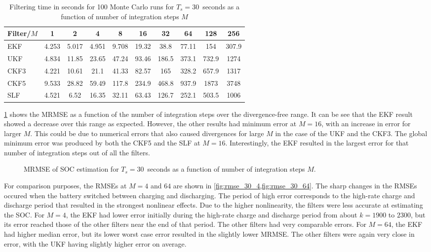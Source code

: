 \documentclass[../zhang_thesis.tex]{subfiles}
\begin{document}
\begin{table}[h]
\centering
\caption{Filtering time in seconds for 100 Monte Carlo runs for $T_s=30$~seconds as a function of number of integration steps $M$}
\begin{tabular}{@{}lccccccccc@{}}
\toprule
Filter/$M$ & 1     & 2     & 4     & 8     & 16    & 32    & 64    & 128   & 256   \\ \midrule
EKF        & 4.253 & 5.017 & 4.951 & 9.708 & 19.32 & 38.8  & 77.11 & 154   & 307.9 \\
UKF        & 4.834 & 11.85 & 23.65 & 47.24 & 93.46 & 186.5 & 373.1 & 732.9 & 1274  \\
CKF3       & 4.221 & 10.61 & 21.1  & 41.33 & 82.57 & 165   & 328.2 & 657.9 & 1317  \\
CKF5       & 9.533 & 28.82 & 59.49 & 117.8 & 234.9 & 468.8 & 937.9 & 1873  & 3748  \\
SLF        & 4.521 & 6.52  & 16.35 & 32.11 & 63.43 & 126.7 & 252.1 & 503.5 & 1006  \\ \bottomrule
\end{tabular}
\label{tab:time_30}
\end{table}

\cref{fig:mrmse_30} shows the MRMSE as a function of the number of integration steps over the divergence-free range. It can be see that the EKF result showed a decrease over this range as expected. However, the other results had minimum error at $M=16$, with an increase in error for larger $M$. This could be due to numerical errors that also caused divergences for large $M$ in the case of the UKF and the CKF3. The global minimum error was produced by both the CKF5 and the SLF at $M=16$.
Interestingly, the EKF resulted in the largest error for that number of integration steps out of all the filters.

\begin{figure}[ht]
\centering
%
\caption{MRMSE of SOC estimation for $T_s=30$~seconds as a function of number of integration steps $M$.}
\label{fig:mrmse_30}
\end{figure}

For comparison purposes, the RMSEs at $M=4$ and $64$ are shown in \cref{fig:rmse_30_4,fig:rmse_30_64}. The sharp changes in the RMSEs occured when the battery switched between charging and discharging. The period of high error corresponds to the high-rate charge and discharge period that resulted in the strongest nonlinear effects. Due to the higher nonlinearity, the filters were less accurate at estimating the SOC. For $M=4$, the EKF had lower error initially during the high-rate charge and discharge period from about $k=1900$ to $2300$, but its error reached those of the other filters near the end of that period. The other filters had very comparable errors. For $M=64$, the EKF
had higher median error, but its lower worst case error resulted in the slightly lower MRMSE. The other filters were again very close in error, with the UKF having slightly higher error on average.
\end{document}

